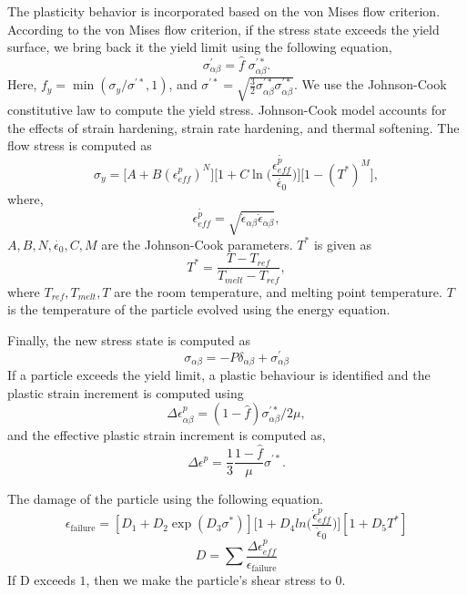 The plasticity behavior is incorporated based on the von Mises flow criterion.
According to the von Mises flow criterion, if the stress state exceeds the yield
surface, we bring back it the yield limit using the following equation,
\begin{equation}
  \sigma^{'}_{\alpha \beta} = \hat{f} \; \sigma^{'*}_{\alpha \beta}.
\end{equation}
Here, $f_y = \min{(\sigma_y / \sigma^{'*}, 1)}$, and
$\sigma^{'*} = \sqrt{\frac{3}{2} \sigma^{'*}_{\alpha \beta}
  \sigma^{'*}_{\alpha \beta}}$. We use the Johnson-Cook constitutive
law \parencite{johnson1983constitutive} to compute the yield
stress. Johnson-Cook model accounts for the effects of strain hardening, strain
rate hardening, and thermal softening. The flow stress is computed as
\begin{equation}
  \sigma_y = \bigg[A + B (\epsilon^{p}_{eff})^N \bigg]
  \bigg[1 + C \ln\bigg(\frac{\dot{\epsilon^{p}_{eff}}}{\dot{\epsilon_0}}\bigg) \bigg] \bigg[1 - (T^*)^M \bigg],
\end{equation}
where,
\begin{equation}
  \dot{\epsilon^{p}_{eff}} = \sqrt{\dot{\epsilon}_{\alpha \beta} \dot{\epsilon}_{\alpha \beta}},
\end{equation}
$A, B, N, \dot{\epsilon_{0}}, C, M$ are the Johnson-Cook parameters. $T^*$ is given as
\begin{equation}
  T^* = \frac{T - T_{ref}}{T_{melt} - T_{ref}},
\end{equation}
where $T_{ref}, T_{melt}, T$ are the room temperature, and melting point
temperature. $T$ is the temperature of the particle evolved using the energy
equation.

Finally, the new stress state is computed as
\begin{equation}
  \sigma_{\alpha \beta} = - P\delta_{\alpha \beta} + \sigma^{'}_{\alpha \beta}
\end{equation}
If a particle exceeds the yield limit, a plastic behaviour is identified and the
plastic strain increment is computed using
\begin{equation}
  \Delta \epsilon^{p}_{\alpha \beta} = (1 - \hat{f}) \sigma^{'*}_{\alpha \beta} / 2 \mu,
\end{equation}
and the effective plastic strain increment is computed as,
\begin{equation}
  \Delta \epsilon^{p} = \frac{1}{3} \frac{1 - \hat{f}}{\mu}\sigma^{'*}.
\end{equation}


The damage of the particle using the following equation.
\begin{equation}
  \epsilon_{\text{failure}} = [D_1 + D_2 \exp(D_3 \sigma^{*})]
  \bigg[ 1 + D_4 ln\big(\frac{\dot{\epsilon}_{eff}^p}{\dot{\epsilon}_{0}})\bigg]
  [1 + D_5 T^*]
\end{equation}
\begin{equation}
  D = \sum\frac{\Delta \epsilon_{eff}^p}{\epsilon_{\text{failure}}}
\end{equation}
If D exceeds $1$, then we make the particle's shear stress to $0$.



